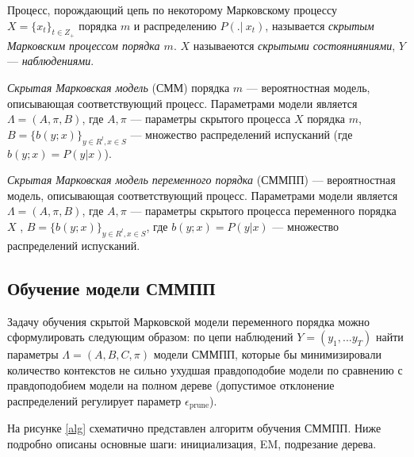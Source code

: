 \documentclass{matmex-diploma-custom}
\begin{document}
\begin{definition}
Процесс, порождающий цепь по некоторому Марковскому процессу $X = \{x_{t}\}_{t \in Z_{+}}$ порядка $m$ и распределению $P(.|~x_{t})$, называется \textit{скрытым Марковским процессом порядка $m$}. 
$ X $ называеются \textit{скрытыми состоянияниями}, $Y$ --- \textit{наблюдениями}.
\end{definition}

\begin{definition}
\textit{Скрытая Марковская модель} (СММ) порядка $ m $ --- вероятностная модель, описывающая соответствующий процесс. Параметрами модели является $\Lambda=(A,\pi,B)$, где $A,\pi$ --- параметры скрытого процесса $X$ порядка $m$,  $ B = \{b(y; x)\}_{y \in R^{l}, x \in S}$ ---  множество распределений испусканий (где $ b(y; x) = P(y|x)$). 
\end{definition}

\begin{definition}
\textit{Скрытая Марковская модель переменного порядка} (СММПП) --- вероятностная модель, описывающая соответствующий процесс. Параметрами модели является $\Lambda=(A,\pi,B)$, где $A,\pi$ --- параметры скрытого процесса переменного порядка $X$ ,  $ B = \{b(y; x)\}_{y \in R^{l}, x \in S}$, где $ b(y; x) = P(y|x)$ ---  множество распределений испусканий. 
\end{definition}


\subsection{Обучение модели СММПП}
Задачу обучения скрытой Марковской модели переменного порядка можно сформулировать следующим образом: 
по цепи наблюдений $ Y = (y_{1}, ... y_{T}) $ найти параметры $\Lambda = (A,B,C,\pi)$ модели СММПП, которые бы минимизировали количество контекстов не сильно ухудшая правдоподобие модели по сравнению с правдоподобием модели на полном дереве (допустимое отклонение распределений регулирует параметр $ \epsilon_{\text{prune}} $).

На рисунке \ref{alg} схематично представлен алгоритм обучения СММПП. Ниже подробно описаны основные шаги: инициализация, EM, подрезание дерева.
\\
\end{document}
